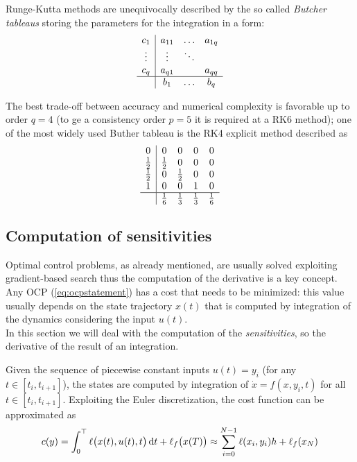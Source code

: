 	Runge-Kutta methods are unequivocally described by the so called \textit{Butcher tableaus} storing the parameters for the integration in a form:
	\begin{equation}
	\begin{array}{c | c c c}
		c_1 & a_{11} & \dots & a_{1q} \\
		\vdots & \vdots & \ddots \\
		c_q & a_{q1} & & a_{qq} \\ \hline
		& b_1 & \dots & b_q
	\end{array}
	\end{equation}
	
	The best trade-off between accuracy and numerical complexity is favorable up to order $q=4$ (to ge a consistency order $p=5$ it is required at a RK6 method); one of the most widely used Buther tableau is the RK4 explicit method described as
	\[ \begin{array}{c | c c c c}
		0 & 0 & 0 & 0 & 0 \\
		\frac 12 & \frac 12 & 0 & 0 & 0 \\
		\frac 12 & 0 & \frac 12 & 0 & 0 \\
		1 & 0 & 0 & 1 & 0 \\ \hline 
		 & \frac 1 6 & \frac 13 & \frac 13 & \frac 16 
	\end{array}\]

\subsection{Computation of sensitivities}
	Optimal control problems, as already mentioned, are usually solved exploiting gradient-based search thus the computation of the derivative is a key concept. Any OCP (\ref{eq:ocpstatement}) has a cost that needs to be minimized: this value usually depends on the state trajectory $x(t)$ that is computed by integration of the dynamics considering the input $u(t)$. \\
	In this section we will deal with the computation of the \textit{sensitivities}, so the derivative of the result of an integration.
	
	Given the sequence of piecewise constant inputs $u(t) = y_i$ (for any $t\in[t_i,t_{i+1}]$), the states are computed by integration of $\dot x = f(x,y_i, t)$ for all $t\in[t_i,t_{i+1}]$. Exploiting the Euler discretization, the cost function can be approximated as
	\[ c(y) = \int_0^\top  \ell\big(x(t),u(t), t\big) \, \mathrm{d} t + \ell_f \big(x(T)\big) \approx \sum_{i=0}^{N-1} \ell(x_i, y_i) h + \ell_f(x_N) \]
	
